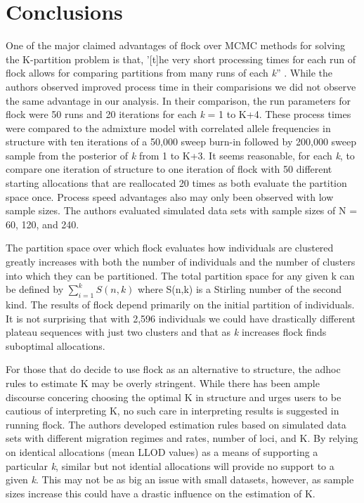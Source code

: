 \section*{Conclusions}

One of the major claimed advantages of {\sc flock} over MCMC methods for solving the 
K-partition problem is that, '[t]he very short processing times for each run of {\sc flock} allows for
 comparing partitions from many runs of each \textit{k}'' \citep[][p.~735]{Duc&Tur2012}.
While the authors observed improved process time in their 
comparisions we did not observe the same advantage in our analysis. In their comparison, the 
run parameters for {\sc flock} were 50 runs and 20 iterations for each \textit{k} = 1 to K+4. 
These process times were compared to the admixture model with correlated allele 
frequencies in {\sc structure} with ten iterations of a 50,000 sweep burn-in followed 
by 200,000 sweep sample from the posterior of \textit{k} from 1 to K+3. 
It seems reasonable, for each \textit{k}, to compare one iteration of {\sc structure} 
to one iteration of {\sc flock} with 50 different starting allocations that are reallocated 20 times 
as both evaluate the partition space once. Process speed advantages also may only been observed 
with low sample sizes. The authors evaluated simulated data sets with sample sizes of N = 60, 120, 
and 240. 

The partition space over which {\sc flock} evaluates how individuals are clustered 
greatly increases with both the number of individuals and the number of clusters into 
which they can be partitioned. The total partition space for any given k can be 
defined by $\sum\limits_{i=1}^k S(n,k)$ where S(n,k) is a Stirling number of the 
second kind. The results of {\sc flock} depend primarily on the initial partition of 
individuals. It is not surprising that with 2,596 individuals we could have 
drastically different plateau sequences with just two clusters and that as \textit{k} increases
{\sc flock} finds suboptimal allocations. 

For those that do decide to use {\sc flock} as an alternative to {\sc structure}, the adhoc rules 
to estimate K may be overly stringent. While there has been ample 
discourse concering choosing the optimal K in  {\sc structure} \citep{Evannoetal2005, 
Pricharedetal2000, Wap&Gag2006} and \citet{Pritchardetal2000} urges users 
to be cautious of interpreting K, no such care in interpreting results 
is suggested in running {\sc flock}. The authors developed estimation rules based on simulated data 
sets with different migration regimes and rates, number of loci, and K. 
By relying on identical allocations (mean LLOD values) as a means of supporting 
a particular \textit{k},  similar but not idential 
allocations will provide no support to a given \textit{k}. This may not be as big an issue with small datasets,
however, as sample sizes increase this could have a drastic influence on the estimation of 
K. 



 
